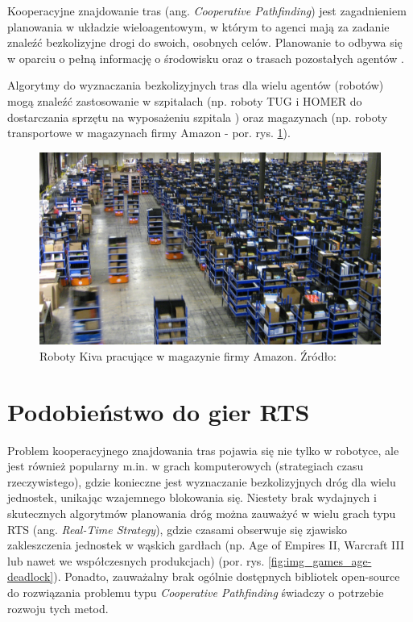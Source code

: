 Kooperacyjne znajdowanie tras (ang. {\it Cooperative Pathfinding}) jest zagadnieniem planowania w układzie wieloagentowym, w którym to agenci mają za zadanie znaleźć bezkolizyjne drogi do swoich, osobnych celów. Planowanie to odbywa się w oparciu o pełną informację o środowisku oraz o trasach pozostałych agentów \cite{cooppath}.

Algorytmy do wyznaczania bezkolizyjnych tras dla wielu agentów (robotów) mogą znaleźć zastosowanie w szpitalach (np. roboty TUG i HOMER do dostarczania sprzętu na wyposażeniu szpitala \cite{tughomer}) oraz magazynach (np. roboty transportowe w magazynach firmy Amazon - por. rys. \ref{fig:image_kiva_amazon}).

\begin{figure}[H]
	\centering
	\includegraphics[width=14cm]{img/kiva-amazon}
	\caption{Roboty Kiva pracujące w magazynie firmy Amazon. Źródło: \cite{amazonkiva}}
	\label{fig:image_kiva_amazon}
\end{figure}

\section{Podobieństwo do gier RTS}
Problem kooperacyjnego znajdowania tras pojawia się nie tylko w robotyce, ale jest również popularny m.in. w grach komputerowych (strategiach czasu rzeczywistego), gdzie konieczne jest wyznaczanie bezkolizyjnych dróg dla wielu jednostek, unikając wzajemnego blokowania się. Niestety brak wydajnych i skutecznych algorytmów planowania dróg można zauważyć w wielu grach typu RTS (ang. {\it Real-Time Strategy}), gdzie czasami obserwuje się zjawisko zakleszczenia jednostek w wąskich gardłach (np. Age of Empires II, Warcraft III lub nawet we współczesnych produkcjach) \cite{efficient_coop_pathplanning} (por. rys. \ref{fig:img_games_age-deadlock}). Ponadto, zauważalny brak ogólnie dostępnych bibliotek open-source do rozwiązania problemu typu {\it Cooperative Pathfinding} świadczy o potrzebie rozwoju tych metod.


